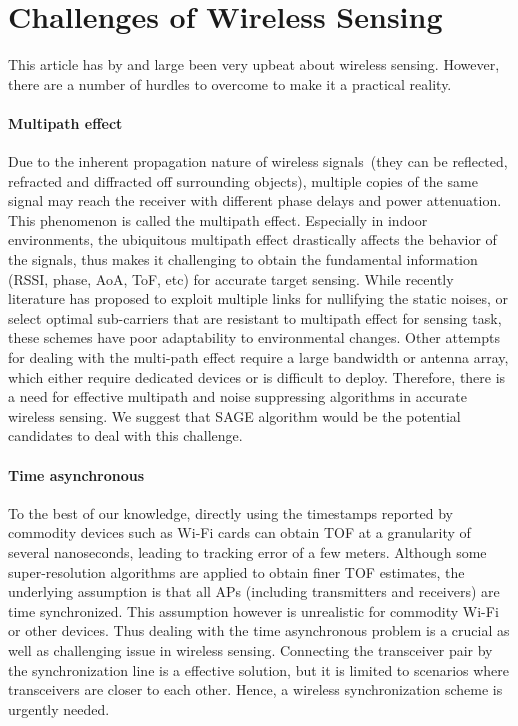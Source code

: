 \section{Challenges of Wireless Sensing}
This article has by and large been very upbeat about wireless sensing. However, there are a number of hurdles to overcome to make it a
practical reality.

\paragraph*{Multipath effect}  Due to the inherent propagation nature of wireless signals~(they can be reflected, refracted and diffracted off
surrounding objects), multiple copies of the same signal may reach the receiver with different phase delays and power attenuation. This
phenomenon is called the multipath effect. Especially in indoor environments, the ubiquitous multipath effect drastically affects the
behavior of the signals, thus makes it challenging to obtain the fundamental information (RSSI, phase, AoA, ToF, etc) for accurate target
sensing. While recently literature has proposed to exploit multiple links for nullifying the static noises, or select optimal sub-carriers
that are resistant to multipath effect for sensing task, these schemes have poor adaptability to environmental changes. Other attempts for
dealing with the multi-path effect require a large bandwidth or antenna array, which either require dedicated devices or is difficult to
deploy. Therefore, there is a need for effective multipath and noise suppressing algorithms in accurate wireless sensing. We suggest that
SAGE algorithm would be the potential candidates to deal with this challenge.

\paragraph*{Time asynchronous} To the best of our knowledge, directly using the timestamps reported by commodity devices such as Wi-Fi cards can obtain TOF at a granularity of several nanoseconds, leading to tracking error of a few meters. Although some super-resolution algorithms are applied to obtain finer TOF estimates, the underlying assumption is that all APs (including transmitters and receivers) are time synchronized. This assumption however is unrealistic for commodity Wi-Fi or other devices. Thus dealing with the time asynchronous problem is a crucial as well as challenging issue in wireless sensing. Connecting the transceiver pair by the synchronization line is a effective solution, but it is limited to scenarios where transceivers are closer to each other. Hence, a wireless synchronization scheme is urgently needed.


